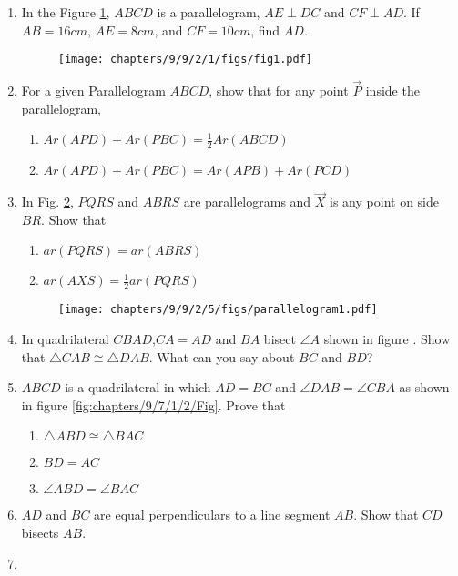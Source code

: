 \begin{enumerate}[label=\thesection.\arabic*,ref=\thesection.\theenumi]
\item In the Figure \ref{fig:9/9/2/1}, $ABCD$ is a parallelogram, $AE \perp DC$ and $CF \perp AD$. If $AB = 16 cm$, $AE = 8 cm$, and $CF = 10cm$, find $AD$.
	\begin{figure}[!h]
		\centering
 \texttt{[image: chapters/9/9/2/1/figs/fig1.pdf]}
		\caption{}
		\label{fig:9/9/2/1}
  	\end{figure}

\item For a given Parallelogram $ABCD$, show that for any
point $\vec{P}$ inside the parallelogram,
\begin{enumerate}
	\item $Ar(APD)+Ar(PBC) = \frac{1}{2}Ar(ABCD)$
	\item $Ar(APD)+Ar(PBC) = Ar(APB)+Ar(PCD)$
\end{enumerate}

\item In Fig.
		\ref{fig:9/9/2/5},
$PQRS$ and $ABRS$ are parallelograms
and $\vec{X}$ is any point on side $BR$. Show that  
\begin{enumerate}
    \item $ar (PQRS) = ar(ABRS)$
	    \label{prop:9/9/2/5}
    \item $ar(AXS) = \frac{1}{2} ar(PQRS)$
\end{enumerate}
	\begin{figure}[!h]
		\centering
 \texttt{[image: chapters/9/9/2/5/figs/parallelogram1.pdf]}
		\caption{}
		\label{fig:9/9/2/5}
  	\end{figure}

%	
\item In quadrilateral $CBAD$,$CA = AD$ and $BA$ bisect $\angle{A}$ shown in figure . Show that $\triangle{CAB} \cong \triangle{DAB}$. What can you say about $BC$ and $BD$? \\
	\solution

\item $ABCD$ is a quadrilateral in which $AD = BC$ and $\angle{DAB} = \angle{CBA}$ as shown in figure \ref{fig:chapters/9/7/1/2/Fig}. Prove that
\begin{enumerate}
\item $\triangle{ABD} \cong \triangle{BAC}$
  \item $BD = AC$
  \item $\angle{ABD} = \angle{BAC}$
\end{enumerate}
	\solution

\item $AD$ and $BC$ are equal perpendiculars to a line segment $AB$. Show that $CD$ bisects $AB$.\\
	\solution

\item

\end{enumerate}

